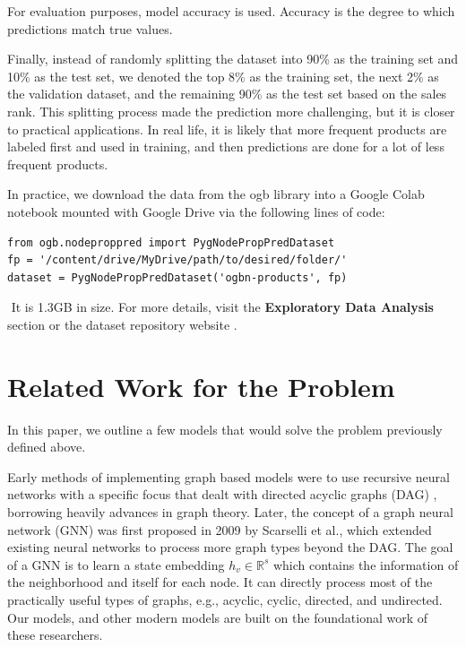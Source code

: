 \documentclass[sigconf, nonacm]{acmart}
\begin{document}
For evaluation purposes, model accuracy is used. Accuracy is the degree to which predictions match true values.
 
Finally, instead of randomly splitting the dataset into 90\% as the training set and 10\% as the test set, we denoted the top 8\% as the training set, the next 2\% as the validation dataset, and the remaining 90\% as the test set based on the sales rank. This splitting process made the prediction more challenging, but it is closer to practical applications. In real life, it is likely that more frequent products are labeled first and used in training, and then predictions are done for a lot of less frequent products.

In practice, we download the data from the ogb library into a Google Colab notebook mounted with Google Drive via the following lines of code: \\
\begin{verbatim}
from ogb.nodeproppred import PygNodePropPredDataset
fp = '/content/drive/MyDrive/path/to/desired/folder/'
dataset = PygNodePropPredDataset('ogbn-products', fp)
\end{verbatim} 
‌‌ 
\newline It is 1.3GB in size. For more details, visit the \textbf{Exploratory Data Analysis} section or the dataset repository website \cite{Bhatia2016}.

\section*{Related Work for the Problem}

In this paper, we outline a few models that would solve the problem previously defined above. 

Early methods of implementing graph based models were to use recursive neural networks with a specific focus that dealt with directed acyclic graphs (DAG) \cite{Sperduti1997}, borrowing heavily advances in graph theory. Later, the concept of a graph neural network (GNN) \cite{Scarselli2009} was first proposed in 2009 by Scarselli et al., which extended existing neural networks to process more graph types beyond the DAG. The goal of a GNN is to learn a state embedding $h_v \in \mathbb{R} ^s$ which contains the information of the neighborhood and itself for each node. It can directly process most of the practically useful types of graphs, e.g., acyclic, cyclic, directed, and undirected. Our models, and other modern models are built on the foundational work of these researchers. 
\end{document}
